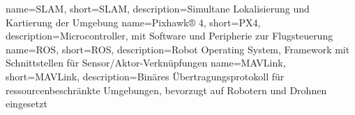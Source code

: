 
{
    name=SLAM,
    short={SLAM},
    description={Simultane Lokalisierung und Kartierung der Umgebung}
}
{
    name=Pixhawk® 4,
    short=PX4,
    description={Microcontroller, mit Software und Peripherie zur Flugsteuerung}
}
{
    name=ROS,
    short=ROS,
    description={Robot Operating System, Framework mit Schnittstellen für Sensor/Aktor-Verknüpfungen}
}
{
    name=MAVLink,
    short=MAVLink,
    description={Binäres Übertragungsprotokoll für ressourcenbeschränkte Umgebungen, bevorzugt auf Robotern und Drohnen eingesetzt}
}
